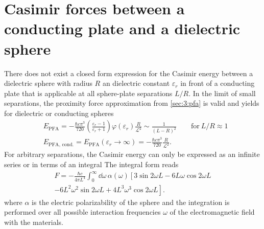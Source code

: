 \section{Casimir forces between a conducting plate and a dielectric sphere} \label{sec:3:casimir-plate-sphere}

There does not exist a closed form expression for the Casimir energy between a dielectric sphere with radius $R$ an dielectric constant $\varepsilon_r$ in front of a conducting plate that is applicable at all sphere-plate separations $L/R$.
In the limit of small separations, the proximity force approximation from \cref{sec:3:pfa} is valid and yields for dielectric or conducting spheres
\begin{align}\label{eq:3:casimir-sphere-plate-PFA}
  &E_\mathrm{PFA} = -\frac{\hbar c \pi^3}{720} \left(\frac{\varepsilon_r - 1}{\varepsilon_r + 1}\right)\varphi(\varepsilon_r) \frac{R}{\mathscr{L}^2} \sim \frac{1}{(L-R)^2} \quad\quad \text{for}\ L/R \approx 1 \\ \label{eq:3:casimir-sphere-plate-PFA-conducting}
  &E_\mathrm{PFA,\,cond.} = E_\mathrm{PFA}(\varepsilon_r \rightarrow \infty) = -\frac{\hbar c \pi^3}{720} \frac{R}{\mathscr{L}^2} .
\end{align}
For arbitrary separations, the Casimir energy can only be expressed as an infinite series \cite{Emig_2007,Emig_2007a} or in terms of an integral \cite{Ford_1998}
The integral form reads
\begin{multline}\label{eq:3:ford-integral}
  F = - \frac{\hbar c}{4 \pi L^4} \int_{0}^{\infty} \dd \omega \, \alpha(\omega) \left[3\sin 2 \omega L - 6L\omega \cos 2 \omega L \right. \\ 
  \left. - 6L^2\omega^2 \sin 2 \omega L + 4L^3\omega^3 \cos 2 \omega L\right].
\end{multline}
where $\alpha$ is the electric polarizability of the sphere and the integration is performed over all possible interaction frequencies $\omega$ of the electromagnetic field with the materials.

